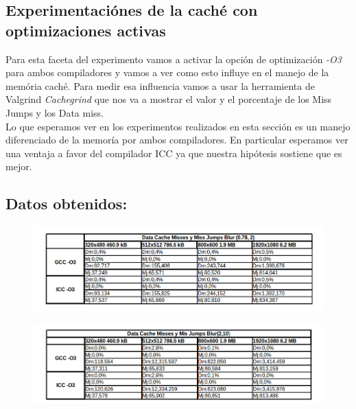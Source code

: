 \subsection{Experimentaciónes de la caché con optimizaciones activas}

Para esta faceta del experimento vamos a activar la opción de optimización \textit{-O3} para ambos compiladores y vamos a ver como esto influye en el manejo de la memória caché.
Para medir esa influencia vamos a usar la herramienta de Valgrind \textit{Cachegrind} que nos va a mostrar el valor y el porcentaje de los Miss Jumps y los Data miss.\\
 Lo que esperamos ver en los experimentos realizados en esta sección es un manejo diferenciado de la memoría por ambos compiladores. En particular esperamos ver una ventaja a favor del compilador ICC ya que nuestra hipótesis sostiene que es mejor.\\

\subsection{Datos obtenidos:}

\begin{figure}[H]
\begin{center}
  \includegraphics[width=\linewidth]{cachecompiladores/blur0782.png}
\end{center}
\end{figure}

\begin{figure}[H]
\begin{center}
  \includegraphics[width=\linewidth]{cachecompiladores/blur15.png}
\end{center}
\end{figure}


